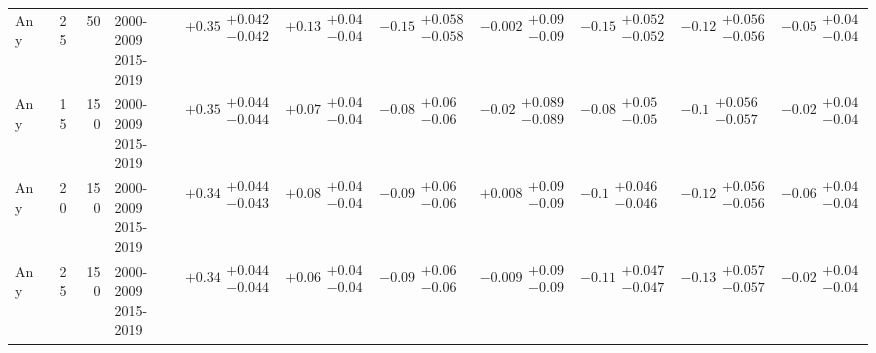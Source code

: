 \begin{table}[H]
\begin{tabular}{lrrllllllll}
Any & 25 & 50 & \makecell{2000-2009 \\ 2015-2019} & $\bm{+0.35}\substack{+0.042 \\ -0.042}$ & $\bm{+0.13}\substack{+0.04 \\ -0.04}$ & $\bm{-0.15}\substack{+0.058 \\ -0.058}$ & $-0.002\substack{+0.09 \\ -0.09}$ & $\bm{-0.15}\substack{+0.052 \\ -0.052}$ & $\bm{-0.12}\substack{+0.056 \\ -0.056}$ & $\bm{-0.05}\substack{+0.04 \\ -0.04}$ \\
Any & 15 & 150 & \makecell{2000-2009 \\ 2015-2019} & $\bm{+0.35}\substack{+0.044 \\ -0.044}$ & $\bm{+0.07}\substack{+0.04 \\ -0.04}$ & $\bm{-0.08}\substack{+0.06 \\ -0.06}$ & $-0.02\substack{+0.089 \\ -0.089}$ & $\bm{-0.08}\substack{+0.05 \\ -0.05}$ & $\bm{-0.1}\substack{+0.056 \\ -0.057}$ & $-0.02\substack{+0.04 \\ -0.04}$ \\
Any & 20 & 150 & \makecell{2000-2009 \\ 2015-2019} & $\bm{+0.34}\substack{+0.044 \\ -0.043}$ & $\bm{+0.08}\substack{+0.04 \\ -0.04}$ & $\bm{-0.09}\substack{+0.06 \\ -0.06}$ & $+0.008\substack{+0.09 \\ -0.09}$ & $\bm{-0.1}\substack{+0.046 \\ -0.046}$ & $\bm{-0.12}\substack{+0.056 \\ -0.056}$ & $\bm{-0.06}\substack{+0.04 \\ -0.04}$ \\
Any & 25 & 150 & \makecell{2000-2009 \\ 2015-2019} & $\bm{+0.34}\substack{+0.044 \\ -0.044}$ & $\bm{+0.06}\substack{+0.04 \\ -0.04}$ & $\bm{-0.09}\substack{+0.06 \\ -0.06}$ & $-0.009\substack{+0.09 \\ -0.09}$ & $\bm{-0.11}\substack{+0.047 \\ -0.047}$ & $\bm{-0.13}\substack{+0.057 \\ -0.057}$ & $-0.02\substack{+0.04 \\ -0.04}$ \\
\bottomrule
\end{tabular}\normalsize\renewcommand{\arraystretch}{1}
\end{table}


